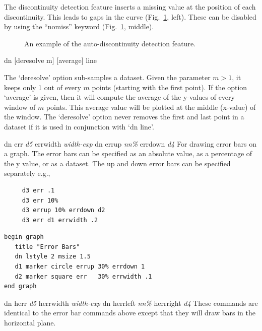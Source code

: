 \begin{commanddescription}
The discontinuity detection feature inserts a missing value at the position of each discontinuity. This leads to gaps in the curve (Fig.~\ref{fig:discont}, left). These can be disabled by using the ``nomiss'' keyword (Fig.~\ref{fig:discont}, middle).

\begin{figure}
\centering
\mbox{}
\caption{\label{fig:discont}An example of the auto-discontinuity detection feature.}
\end{figure}

\item[{\sf dn [deresolve m] [average] line}]

The `{\sf deresolve}' option sub-samples a dataset. Given the parameter $m > 1$, it keeps only 1 out of every $m$ points (starting with the first point). If the option `{\sf average}' is given, then it will compute the average of the y-values of every window of $m$ points. This average value will be plotted at the middle (x-value) of the window. The `{\sf deresolve}' option never removes the first and last point in a dataset if it is used in conjunction with `{\sf dn line}'.

\item[{\sf dn err {\it d5} errwidth {\it width-exp} dn errup {\it nn\%} errdown {\it d4}} ]
   
For drawing error bars on a graph. The error bars can be specified as
an absolute value, as a percentage of the y value, or as a dataset.
The up and down error bars can be specified separately e.g.,

\preglecode{}
\begin{Verbatim}
     d3 err .1
     d3 err 10%
     d3 errup 10% errdown d2
     d3 err d1 errwidth .2
\end{Verbatim}
\postglecode{}

\begin{minipage}[c]{8cm}
\begin{Verbatim}
begin graph
   title "Error Bars"
   dn lstyle 2 msize 1.5
   d1 marker circle errup 30% errdown 1
   d2 marker square err   30% errwidth .1
end graph
\end{Verbatim}
\end{minipage}
\hfill
\begin{minipage}[c]{7cm}
\mbox{}
\end{minipage}

\item[{\sf dn herr {\it d5} herrwidth {\it width-exp} dn herrleft {\it nn\%} herrright {\it d4}} ]
   
These commands are identical to the error bar commands above except that
they will draw bars in the horizontal plane.


\end{commanddescription}
